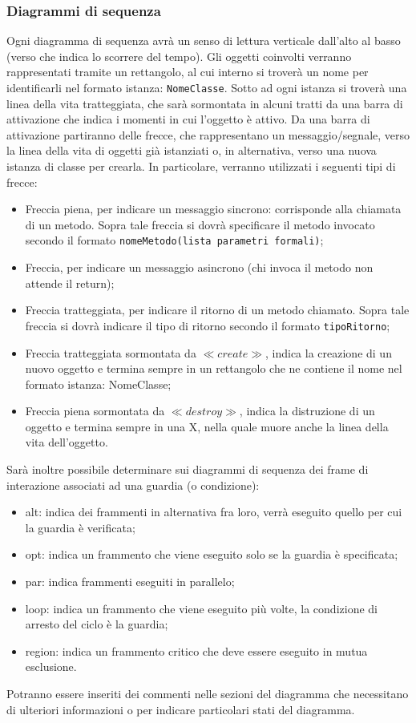 \documentclass[NormeDiProgetto.tex]{subfiles}
\begin{document}
\subsubsection{Diagrammi di sequenza}
Ogni diagramma di sequenza avrà un senso di lettura verticale dall'alto al basso (verso che indica lo scorrere del tempo). Gli oggetti coinvolti verranno rappresentati tramite un rettangolo, al cui interno si troverà un nome per identificarli nel formato istanza: \texttt{NomeClasse}. Sotto ad ogni istanza si troverà una linea della vita tratteggiata, che sarà sormontata in alcuni tratti da una barra di attivazione che indica i momenti in cui l'oggetto è attivo. Da una barra di attivazione partiranno delle frecce, che rappresentano un messaggio/segnale, verso la linea della vita di oggetti già istanziati o, in alternativa, verso una nuova istanza di classe per crearla. In particolare, verranno utilizzati i seguenti tipi di frecce:
\begin{itemize}
\item  Freccia piena, per indicare un messaggio sincrono: corrisponde alla chiamata di un metodo. Sopra tale freccia si dovrà specificare il metodo invocato secondo il formato \texttt{nomeMetodo(lista parametri formali)};
\item  Freccia, per indicare un messaggio asincrono (chi invoca il metodo non attende il return);
\item  Freccia tratteggiata, per indicare il ritorno di un metodo chiamato. Sopra tale
freccia si dovrà indicare il tipo di ritorno secondo il formato \texttt{tipoRitorno};
\item  Freccia tratteggiata sormontata da $\ll create \gg$, indica la creazione di un nuovo
oggetto e termina sempre in un rettangolo che ne contiene il nome nel formato
istanza: NomeClasse;
\item  Freccia piena sormontata da $\ll destroy \gg$, indica la distruzione di un oggetto e
termina sempre in una X, nella quale muore anche la linea della vita dell'oggetto.
\end{itemize}
Sarà inoltre possibile determinare sui diagrammi di sequenza dei frame di interazione associati ad una guardia (o condizione):
\begin{itemize}
\item alt: indica dei frammenti in alternativa fra loro, verrà eseguito quello per cui la guardia è verificata;
\item opt: indica un frammento che viene eseguito solo se la guardia è specificata;
\item par: indica frammenti eseguiti in parallelo;
\item loop: indica un frammento che viene eseguito più volte, la condizione di arresto del ciclo è la guardia;
\item region: indica un frammento critico che deve essere eseguito in mutua esclusione.
\end{itemize}
Potranno essere inseriti dei commenti nelle sezioni del diagramma che necessitano di ulteriori informazioni o per indicare particolari stati del diagramma.
\end{document}
